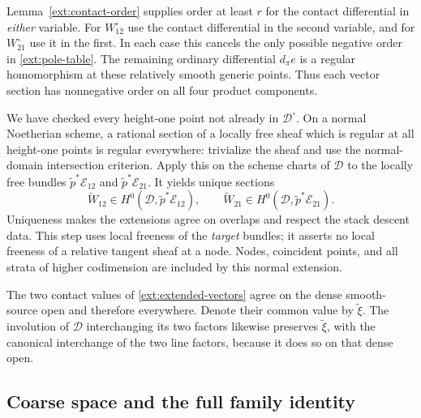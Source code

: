 Lemma~\ref{ext:contact-order} supplies order at least $r$ for the
contact differential in \emph{either} variable. For $W_{12}^\circ$
use the contact differential in the second variable, and for
$W_{21}^\circ$ use it in the first. In each case this cancels the
only possible negative order in \eqref{ext:pole-table}. The remaining
ordinary differential $d_\pi e$ is a regular homomorphism at these
relatively smooth generic points. Thus each vector section has
nonnegative order on all four product components.

We have checked every height-one point not already in
$\mathcal D^\circ$. On a normal Noetherian scheme, a rational
section of a locally free sheaf which is regular at all height-one
points is regular everywhere: trivialize the sheaf and use the
normal-domain intersection criterion. Apply this on the scheme
charts of $\mathcal D$ to the locally free bundles
$\widetilde p^*\mathcal E_{12}$ and
$\widetilde p^*\mathcal E_{21}$. It yields unique sections
\begin{equation}\label{ext:extended-vectors}
\widetilde W_{12}\in
H^0(\mathcal D,\widetilde p^*\mathcal E_{12}),\qquad
\widetilde W_{21}\in
H^0(\mathcal D,\widetilde p^*\mathcal E_{21}).
\end{equation}
Uniqueness makes the extensions agree on overlaps and respect the
stack descent data. This step uses local freeness of the
\emph{target} bundles; it asserts no local freeness of a relative
tangent sheaf at a node. Nodes, coincident points, and all strata
of higher codimension are included by this normal extension.

The two contact values of \eqref{ext:extended-vectors} agree on
the dense smooth-source open and therefore everywhere. Denote
their common value by $\widetilde\xi$. The involution of
$\mathcal D$ interchanging its two factors likewise preserves
$\widetilde\xi$, with the canonical interchange of the two line
factors, because it does so on that dense open.

\subsection{Coarse space and the full family identity}

